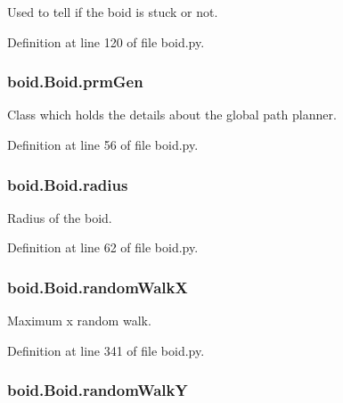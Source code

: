 Used to tell if the boid is stuck or not. 



Definition at line 120 of file boid.\-py.

\hypertarget{classboid_1_1Boid_ac7d14690dde12ebc05f8f5ea80e29869}{
\subsubsection[{prm\-Gen}]{\setlength{\rightskip}{0pt plus 5cm}boid.\-Boid.\-prm\-Gen}}\label{classboid_1_1Boid_ac7d14690dde12ebc05f8f5ea80e29869}


Class which holds the details about the global path planner. 



Definition at line 56 of file boid.\-py.

\hypertarget{classboid_1_1Boid_a1bff2843c74b712aba274831d0a715d4}{
\subsubsection[{radius}]{\setlength{\rightskip}{0pt plus 5cm}boid.\-Boid.\-radius}}\label{classboid_1_1Boid_a1bff2843c74b712aba274831d0a715d4}


Radius of the boid. 



Definition at line 62 of file boid.\-py.

\hypertarget{classboid_1_1Boid_a996d92e215eb56d98a811c86c7118637}{
\subsubsection[{random\-Walk\-X}]{\setlength{\rightskip}{0pt plus 5cm}boid.\-Boid.\-random\-Walk\-X}}\label{classboid_1_1Boid_a996d92e215eb56d98a811c86c7118637}


Maximum x random walk. 



Definition at line 341 of file boid.\-py.

\hypertarget{classboid_1_1Boid_a1bf0149b7eadf9e6a0f08c93d95bac73}{
\subsubsection[{random\-Walk\-Y}]{\setlength{\rightskip}{0pt plus 5cm}boid.\-Boid.\-random\-Walk\-Y}}\label{classboid_1_1Boid_a1bf0149b7eadf9e6a0f08c93d95bac73}


